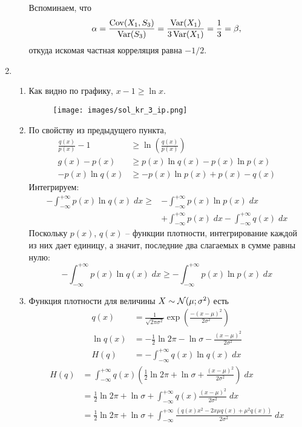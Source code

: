 \begin{enumerate}
\begin{enumerate}
Вспоминаем, что
\[
\alpha = \frac{\operatorname{Cov}(X_1,S_3)}{\operatorname{Var}(S_3)} = \frac{\operatorname{Var}(X_1)}{3\operatorname{Var}(X_1)} = \frac{1}{3} = \beta,
\]
откуда искомая частная корреляция равна $-1/2$.
\end{enumerate}
\item
\begin{enumerate}
\item Как видно по графику, $x-1\geq \ln x$.
\begin{figure}[ht!]
\begin{center}
\texttt{[image: images/sol\_kr\_3\_ip.png]}
\end{center}
\end{figure}
\item По свойству из предыдущего пункта,
\begin{align*}
\frac{q(x)}{p(x)} - 1 &\geq \ln \left(\frac{q(x)}{p(x)}\right) \\
g(x)-p(x) &\geq p(x)\ln q(x)-p(x)\ln p(x) \\
-p(x)\ln q(x) & \geq -p(x)\ln p(x) + p(x) - q(x)
\end{align*}
Интегрируем:
\begin{align*}
-\int^{+\infty}_{-\infty}p(x)\ln q(x) \; dx \geq &-\int^{+\infty}_{-\infty}p(x)\ln p(x) \; dx \\
&+\int^{+\infty}_{-\infty}p(x) \; dx - \int^{+\infty}_{-\infty}q(x) \; dx
\end{align*}
Поскольку $p(x)$, $q(x)$ – функции плотности, интегрирование каждой из них дает
единицу, а значит, последние два слагаемых в сумме равны нулю:
\[
-\int^{+\infty}_{-\infty}p(x)\ln q(x) \; dx \geq -\int^{+\infty}_{-\infty}p(x)\ln p(x) \; dx
\]
\item Функция плотности для величины $X \sim \mathcal{N}(\mu;\sigma^2)$ есть
\begin{align*}
q(x)&=\frac{1}{\sqrt{2\pi\sigma^2}}\exp{\left(\frac{-(x-\mu)^2}{2\sigma^2}\right)}\\
\ln q(x)&=-\frac{1}{2}\ln 2\pi-\ln \sigma-\frac{(x-\mu)^2}{2\sigma^2}\\
H(q)&=-\int^{+\infty}_{-\infty}q(x)\ln q(x) \; dx
\end{align*}
\begin{align*}
H(q)&=\int^{+\infty}_{-\infty}q(x)\left(\frac{1}{2}\ln 2\pi+\ln \sigma+\frac{(x-\mu)^2}{2\sigma^2}\right) \; dx\\
&=\frac{1}{2}\ln 2\pi + \ln \sigma+\int^{+\infty}_{-\infty}q(x)\frac{(x-\mu)^2}{2\sigma^2} \; dx\\
&=\frac{1}{2}\ln 2\pi + \ln \sigma+\int^{+\infty}_{-\infty}\frac{\left(q(x)x^2-2x\mu q(x)+\mu^2q(x)\right)}{2\sigma^2} \; dx\\

\end{align*}
\end{enumerate}
\end{enumerate}
